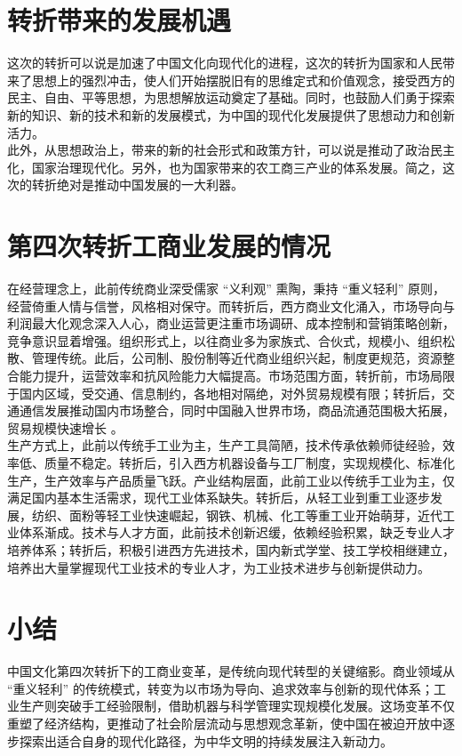 \documentclass[supercite]{Experimental_Report}
\theoremstyle{definition}
\begin{document}
	\section{转折带来的发展机遇}
	这次的转折可以说是加速了中国文化向现代化的进程，这次的转折为国家和人民带来了思想上的强烈冲击，使人们开始摆脱旧有的思维定式和价值观念，接受西方的民主、自由、平等思想，为思想解放运动奠定了基础。同时，也鼓励人们勇于探索新的知识、新的技术和新的发展模式，为中国的现代化发展提供了思想动力和创新活力。\\此外，从思想政治上，带来的新的社会形式和政策方针，可以说是推动了政治民主化，国家治理现代化。另外，也为国家带来的农工商三产业的体系发展。简之，这次的转折绝对是推动中国发展的一大利器。
	
	\section{第四次转折工商业发展的情况}
	在经营理念上，此前传统商业深受儒家 “义利观” 熏陶，秉持 “重义轻利” 原则，经营倚重人情与信誉，风格相对保守。而转折后，西方商业文化涌入，市场导向与利润最大化观念深入人心，商业运营更注重市场调研、成本控制和营销策略创新，竞争意识显着增强。组织形式上，以往商业多为家族式、合伙式，规模小、组织松散、管理传统。此后，公司制、股份制等近代商业组织兴起，制度更规范，资源整合能力提升，运营效率和抗风险能力大幅提高。市场范围方面，转折前，市场局限于国内区域，受交通、信息制约，各地相对隔绝，对外贸易规模有限；转折后，交通通信发展推动国内市场整合，同时中国融入世界市场，商品流通范围极大拓展，贸易规模快速增长 。\\
	生产方式上，此前以传统手工业为主，生产工具简陋，技术传承依赖师徒经验，效率低、质量不稳定。转折后，引入西方机器设备与工厂制度，实现规模化、标准化生产，生产效率与产品质量飞跃。产业结构层面，此前工业以传统手工业为主，仅满足国内基本生活需求，现代工业体系缺失。转折后，从轻工业到重工业逐步发展，纺织、面粉等轻工业快速崛起，钢铁、机械、化工等重工业开始萌芽，近代工业体系渐成。技术与人才方面，此前技术创新迟缓，依赖经验积累，缺乏专业人才培养体系；转折后，积极引进西方先进技术，国内新式学堂、技工学校相继建立，培养出大量掌握现代工业技术的专业人才，为工业技术进步与创新提供动力。
	
	\section{小结}
	中国文化第四次转折下的工商业变革，是传统向现代转型的关键缩影。商业领域从 “重义轻利” 的传统模式，转变为以市场为导向、追求效率与创新的现代体系；工业生产则突破手工经验限制，借助机器与科学管理实现规模化发展。这场变革不仅重塑了经济结构，更推动了社会阶层流动与思想观念革新，使中国在被迫开放中逐步探索出适合自身的现代化路径，为中华文明的持续发展注入新动力。
	
	
	
\end{document}
